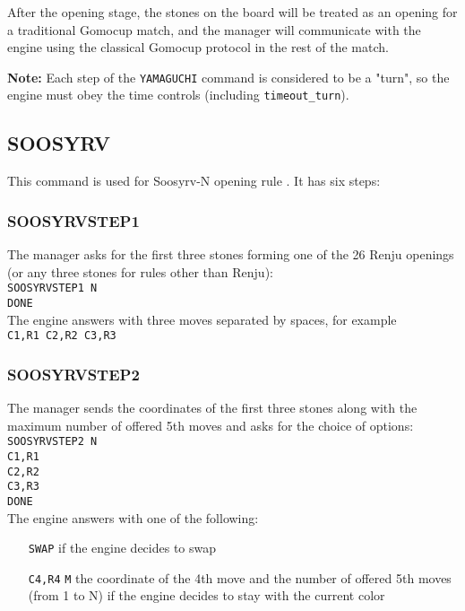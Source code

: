 \documentclass[12pt,a4paper]{article}
\begin{document}
After the opening stage, the stones on the board will be treated as an opening for a traditional Gomocup match, and the manager will communicate with the engine using the classical Gomocup protocol in the rest of the match.

\textbf{Note:} Each step of the \texttt{YAMAGUCHI} command is considered to be a "turn", so the engine must obey the time controls (including \texttt{timeout{\_}turn}).


\subsection{SOOSYRV}
\label{cmd_soosyrv}
This command is used for Soosyrv-N opening rule \cite{renju_opening_rules}. It has six steps:

\subsubsection{SOOSYRVSTEP1}
The manager asks for the first three stones forming one of the 26 Renju openings (or any three stones for rules other than Renju):\\
\texttt{SOOSYRVSTEP1 N}\\
\texttt{DONE}\\
The engine answers with three moves separated by spaces, for example\\
\texttt{C1,R1 C2,R2 C3,R3}

\subsubsection{SOOSYRVSTEP2}
The manager sends the coordinates of the first three stones along with the maximum number of offered 5th moves and asks for the choice of options:\\
\texttt{SOOSYRVSTEP2 N}\\
\texttt{C1,R1}\\
\texttt{C2,R2}\\
\texttt{C3,R3}\\
\texttt{DONE}\\
The engine answers with one of the following:
\begin{enumerate}[leftmargin=7.5em]
\item[\texttt{SWAP}]{if the engine decides to swap}
\item[\texttt{C4,R4} \texttt{M}]{the coordinate of the 4th move and the number of offered 5th moves (from 1 to N) if the engine decides to stay with the current color}
\end{enumerate}
\end{document}
